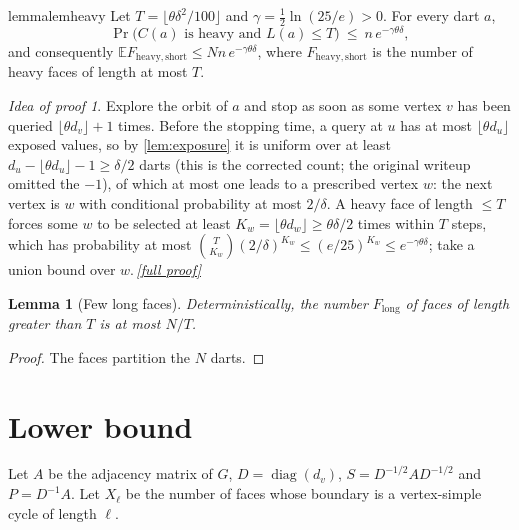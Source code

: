 \documentclass[11pt,a4paper]{article}
\theoremstyle{plain}
\newtheorem{lemma}[theorem]{Lemma}
\theoremstyle{definition}
\theoremstyle{remark}
\newtheorem*{proofidea}{Idea of proof}
\newcommand{\fullproofref}[1]{\,\hyperref[#1]{\textit{[full proof]}}}
\newcommand{\E}{\mathbb E}
\newcommand{\Fheavy}{F_{\mathrm{heavy,short}}}
\newcommand{\Flong}{F_{\mathrm{long}}}
\begin{document}
\begin{restatable}{lemma}{lemheavy}\label{lem:heavy}
Let $T=\lfloor\theta\delta^2/100\rfloor$ and $\gamma=\tfrac12\ln(25/e)>0$. For every dart $a$,
\[
 \Pr\bigl(C(a)\text{ is heavy and }L(a)\le T\bigr)\ \le\ n\,e^{-\gamma\theta\delta},
\]
and consequently $\E\Fheavy\le Nn\,e^{-\gamma\theta\delta}$, where $\Fheavy$ is the number of heavy faces of length at most $T$.
\end{restatable}
\begin{proofidea}
Explore the orbit of $a$ and stop as soon as some vertex $v$ has been queried $\lfloor\theta d_v\rfloor+1$ times. Before the stopping time, a query at $u$ has at most $\lfloor\theta d_u\rfloor$ exposed values, so by \cref{lem:exposure} it is uniform over at least $d_u-\lfloor\theta d_u\rfloor-1\ge\delta/2$ darts (this is the corrected count; the original writeup omitted the $-1$), of which at most one leads to a prescribed vertex $w$: the next vertex is $w$ with conditional probability at most $2/\delta$. A heavy face of length $\le T$ forces some $w$ to be selected at least $K_w=\lfloor\theta d_w\rfloor\ge\theta\delta/2$ times within $T$ steps, which has probability at most $\binom T{K_w}(2/\delta)^{K_w}\le(e/25)^{K_w}\le e^{-\gamma\theta\delta}$; take a union bound over $w$.\fullproofref{pf:heavy}
\end{proofidea}

\begin{lemma}[Few long faces]\label{lem:long}
Deterministically, the number $\Flong$ of faces of length greater than $T$ is at most $N/T$.
\end{lemma}
\begin{proof}
The faces partition the $N$ darts.
\end{proof}

\section{Lower bound}\label{sec:lower}

Let $A$ be the adjacency matrix of $G$, $D=\operatorname{diag}(d_v)$, $S=D^{-1/2}AD^{-1/2}$ and $P=D^{-1}A$. Let $X_\ell$ be the number of faces whose boundary is a vertex-simple cycle of length $\ell$.
\end{document}
